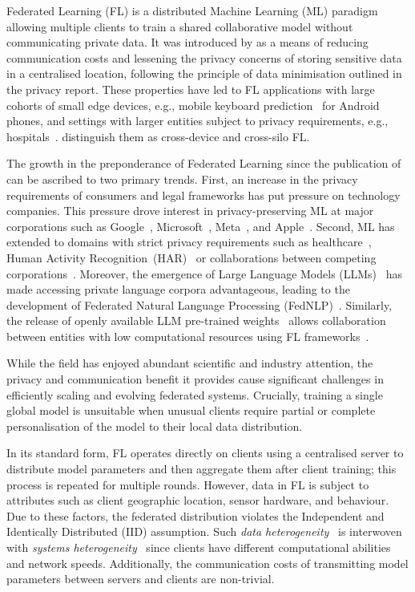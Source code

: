 Federated Learning (FL) is a distributed Machine Learning (ML) paradigm allowing multiple clients to train a shared collaborative model without communicating private data. It was introduced by \citet{FedAvg} as a means of reducing communication costs and lessening the privacy concerns of storing sensitive data in a centralised location, following the principle of data minimisation outlined in the \citet{White_House_Report} privacy report. These properties have led to FL applications with large cohorts of small edge devices, e.g., mobile keyboard prediction~\citep{GoogleKeyboard} for Android phones, and settings with larger entities subject to privacy requirements, e.g., hospitals~\citep{FLmedicine}. \citet{AdvancedAndOpenProblems} distinguish them as cross-device and cross-silo FL\@.

The growth in the preponderance of Federated Learning since the publication of \citet{FedAvg} can be ascribed to two primary trends. First, an increase in the privacy requirements of consumers and legal frameworks has put pressure on technology companies. This pressure drove interest in privacy-preserving ML at major corporations such as Google~\citep{FedAvg,GoogleKeyboard,tensorflowfederated,PracticalPrivateFLkairouz21b}, Microsoft~\citep{FLINT,Flute}, Meta~\citep{PAPAYA,FedBuff}, and Apple~\citep{AppleFL}. Second, ML has extended to domains with strict privacy requirements such as healthcare~\citep{FLmedicine,FutureOfHealth,BigDataCancer}, Human Activity Recognition~(HAR)~\citep{HARusingFL_2018,ClusterFL} or collaborations between competing corporations~\citep{SustainableIncentive,TowardsFairPrivacyPreservingFL}. Moreover, the emergence of Large Language Models (LLMs)~\citep{OpportunitiesAndRisksLLM} has made accessing private language corpora advantageous, leading to the development of Federated Natural Language Processing (FedNLP)~\citep{FedNLP}. Similarly, the release of openly available LLM pre-trained weights~\citep{LLaMA} allows collaboration between entities with low computational resources using FL frameworks~\citep{Flower,FedScale,FedML}.

While the field has enjoyed abundant scientific and industry attention, the privacy and communication benefit it provides cause significant challenges in efficiently scaling and evolving federated systems. Crucially, training a single global model is unsuitable when unusual clients require partial or complete personalisation of the model to their local data distribution.

In its standard form, FL operates directly on clients using a centralised server to distribute model parameters and then aggregate them after client training; this process is repeated for multiple rounds. However, data in FL is subject to attributes such as client geographic location, sensor hardware, and behaviour. Due to these factors, the federated distribution violates the Independent and Identically Distributed (IID) assumption. Such \emph{data heterogeneity}~\citep[sec. 3.1]{AdvancedAndOpenProblems} is interwoven with \emph{systems heterogeneity}~\citep[sec. 7.2]{AdvancedAndOpenProblems} since clients have different computational abilities and network speeds. Additionally, the communication costs of transmitting model parameters between servers and clients are non-trivial.

